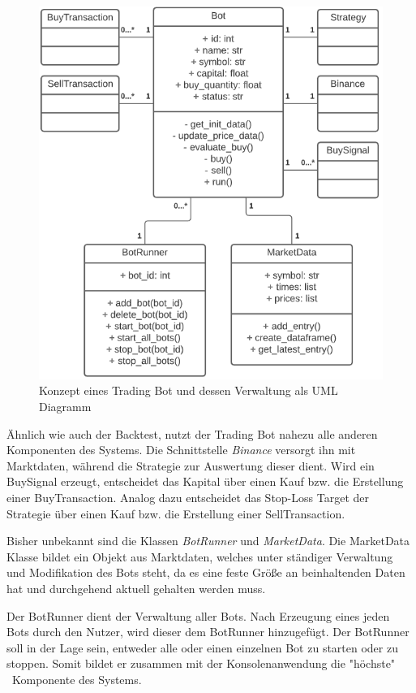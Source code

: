 \documentclass[oneside]{ausarbeitung}
\begin{document}
\begin{figure}[H]
  \centering
  \includegraphics[height=0.65\textheight]{uml/bot_uml.png}
  \caption{Konzept eines Trading Bot und dessen Verwaltung als UML Diagramm}
  \label{fig:14}
\end{figure}

Ähnlich wie auch der Backtest, nutzt der Trading Bot nahezu alle anderen Komponenten des Systems. Die Schnittstelle \textit{Binance} versorgt ihn mit Marktdaten, während die Strategie zur Auswertung dieser dient. Wird ein BuySignal erzeugt, entscheidet das Kapital über einen Kauf bzw. die Erstellung einer BuyTransaction. Analog dazu entscheidet das Stop-Loss Target der Strategie über einen Kauf bzw. die Erstellung einer SellTransaction.

Bisher unbekannt sind die Klassen \textit{BotRunner} und \textit{MarketData}. Die MarketData Klasse bildet ein Objekt aus Marktdaten, welches unter ständiger Verwaltung und Modifikation des Bots steht, da es eine feste Größe an beinhaltenden Daten hat und durchgehend aktuell gehalten werden muss.

Der BotRunner dient der Verwaltung aller Bots. Nach Erzeugung eines jeden Bots durch den Nutzer, wird dieser dem BotRunner hinzugefügt. Der BotRunner soll in der Lage sein, entweder alle oder einen einzelnen Bot zu starten oder zu stoppen. Somit bildet er zusammen mit der Konsolenanwendung die "höchste" \ Komponente des Systems.
\end{document}

